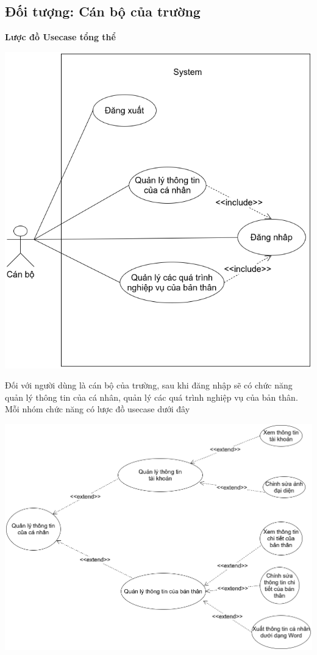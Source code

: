 \subsection{Đối tượng: Cán bộ của trường}
\textbf{Lược đồ Usecase tổng thể}
\begin{center}
  \captionsetup{type=figure}
  \includegraphics[scale=0.5]{img/UML/User/user.png}
\end{center}
Đối với người dùng là cán bộ của trường, sau khi đăng nhập sẽ có chức năng quản lý thông tin của cá nhân, quản lý các quá trình nghiệp vụ của bản thân.
Mỗi nhóm chức năng có lược đồ usecase dưới đây
\begin{center}
  \captionsetup{type=figure}
  \includegraphics[scale=0.4]{img/UML/User/quanlythongtin.png}
\end{center}

